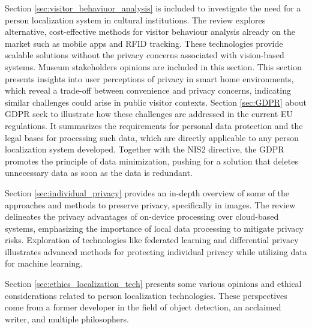 Section \ref{sec:visitor_behaviuor_analysis} is included to investigate the need for a person localization system in cultural institutions. The review explores alternative, cost-effective methods for visitor behaviour analysis already on the market such as mobile apps and RFID tracking. These technologies provide scalable solutions without the privacy concerns associated with vision-based systems. Museum stakeholders opinions are included in this section. This section presents insights into user perceptions of privacy in smart home environments, which reveal a trade-off between convenience and privacy concerns, indicating similar challenges could arise in public visitor contexts. Section \ref{sec:GDPR} about GDPR seek to illustrate how these challenges are addressed in the current EU regulations. It summarizes the requirements for personal data protection and the legal bases for processing such data, which are directly applicable to any person localization system developed. Together with the NIS2 directive, the GDPR promotes the principle of data minimization, pushing for a solution that deletes unnecessary data as soon as the data is redundant.

Section \ref{sec:individual_privacy} provides an in-depth overview of some of the approaches and methods to preserve privacy, specifically in images. The review delineates the privacy advantages of on-device processing over cloud-based systems, emphasizing the importance of local data processing to mitigate privacy risks. Exploration of technologies like federated learning and differential privacy illustrates advanced methods for protecting individual privacy while utilizing data for machine learning. 

Section \ref{sec:ethics_localization_tech} presents some various opinions and ethical considerations related to person localization technologies. These perspectives come from a former developer in the field of object detection, an acclaimed writer, and multiple philosophers. 

